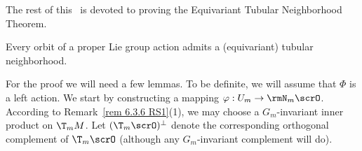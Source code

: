 The rest of this \sect\ is devoted to proving the Equivariant Tubular Neighborhood Theorem.

\begin{thm}\label{thm 6.4.3 RS1 equiv tubular neighb}
    Every orbit of a proper Lie group action admits a (equivariant) tubular neighborhood.
\end{thm}

For the proof we will need a few lemmas. To be definite, we will assume that $\Phi$ is a left action. We start by constructing a mapping $\varphi:U_m\to \rmN_m\scrO$. According to Remark~\ref{rem 6.3.6 RS1}(1), we may choose a $G_m$-invariant inner product on $\T_mM$. Let $(\T_m\scrO)^\perp$ denote the corresponding orthogonal complement of $\T_m\scrO$ (although any $G_m$-invariant complement will do).

